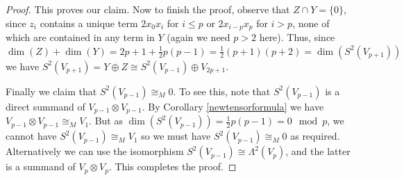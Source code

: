 \documentclass[10pt,a4paper]{amsart}
\begin{document}
\begin{proof}
This proves our claim. Now to finish the proof, observe that $Z \cap Y = \{0\}$, since $z_i$ contains a unique term $2x_0x_i$ for $i \leq p$ or $2x_{i-p}x_p$ for $i>p$, none of which are contained in any term in $Y$ (again we need $p>2$ here). Thus, since $\dim(Z)+\dim(Y) = 2p+1+\frac12 p(p-1) = \frac12 (p+1)(p+2) = \dim(S^2(V_{p+1}))$ we have $S^2(V_{p+1}) = Y \oplus Z \cong S^2(V_{p-1}) \oplus V_{2p+1}$.

Finally we claim that $S^2(V_{p-1}) \cong_M 0$. To see this, note that $S^2(V_{p-1})$ is a direct summand of $V_{p-1} \otimes V_{p-1}$. By Corollary \ref{newtensorformula} we have $V_{p-1} \otimes V_{p-1} \cong_M V_1$. But as $\dim( S^2(V_{p-1}) ) = \frac12 p(p-1) = 0 \mod p$, we cannot have 
$S^2(V_{p-1}) \cong_M V_1$ so we must have  $S^2(V_{p-1}) \cong_M 0$ as required. Alternatively we can use the isomorphism $S^2(V_{p-1}) \cong \Lambda^2(V_p)$, and the latter is a summand of $V_p \otimes V_p$. This completes the proof.
\end{proof}
\end{document}
